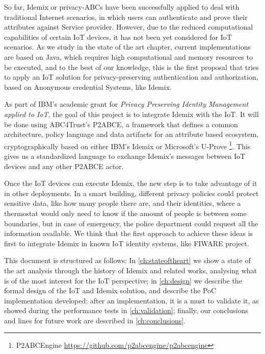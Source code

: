 \documentclass[journal]{IEEEtran}
\begin{document}
So far, Idemix or privacy-ABCs have been successfully applied to deal with traditional Internet scenarios, in which users can authenticate and prove their attributes against Service provider. However, due to the reduced computational capabilities of certain IoT devices, it has not been yet considered for IoT scenarios. As we study in the state of the art chapter, current implementations are based on Java, which requires high computational and memory resources to be executed, and to the best of our knowledge, this is the first proposal that tries to apply an IoT solution for privacy-preserving authentication and authorization, based on Anonymous credential Systems, like Idemix.


As part of IBM's academic grant for \textit{Privacy Preserving Identity Management applied to IoT}, the goal of this project is to integrate Idemix with the IoT. It will be done using ABC4Trust's P2ABCE, a framework that defines a common architecture, policy language and data artifacts for an attribute based ecosystem, cryptographically based on either IBM's Idemix or Microsoft's U-Prove \footnote{P2ABCEngine \url{https://github.com/p2abcengine/p2abcengine}}. This gives us a standardized language to exchange Idemix's messages between IoT devices and any other P2ABCE actor.

Once the IoT devices can execute Idemix, the new step is to take advantage of it in other deployments. In a smart building, different privacy policies could protect sensitive data, like how many people there are, and their identities, where a thermostat would only need to know if the amount of people is between some boundaries, but in case of emergency, the police department could request all the information available. We think that the first approach to achieve these ideas is first to integrate Idemix in known IoT identity systems, like FIWARE project. 

\hfil


This document is structured as follows: In \autoref{ch:stateoftheart} we show a state of the art analysis through the history of Idemix and related works, analysing what is of the most interest for the IoT perspective; in \autoref{ch:design} we describe the formal design of the IoT and Idemix solution, and describe the PoC implementation developed; after an implementation, it is a must to validate it, as showed during the performance tests in \autoref{ch:validation}; finally, our conclusions and lines for future work are described in \autoref{ch:conclusions}.
\end{document}
